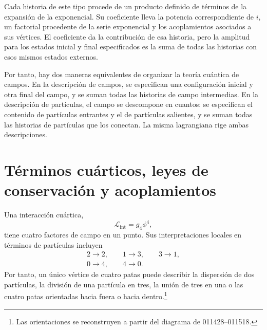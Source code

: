 Cada historia de este tipo procede de un producto definido de términos de la expansión de la exponencial. Su coeficiente lleva la potencia correspondiente de \(i\), un factorial procedente de la serie exponencial y los acoplamientos asociados a sus vértices. El coeficiente da la contribución de esa historia, pero la amplitud para los estados inicial y final especificados es la suma de todas las historias con esos mismos estados externos.

\begin{classroomqa}\end{classroomqa}

Por tanto, hay dos maneras equivalentes de organizar la teoría cuántica de campos. En la descripción de campos, se especifican una configuración inicial y otra final del campo, y se suman todas las historias de campo intermedias. En la descripción de partículas, el campo se descompone en cuantos: se especifican el contenido de partículas entrantes y el de partículas salientes, y se suman todas las historias de partículas que los conectan. La misma lagrangiana rige ambas descripciones.

\section{Términos cuárticos, leyes de conservación y acoplamientos}

Una interacción cuártica,
\begin{equation}
\mathcal{L}_{\mathrm{int}}=g_4\phi^4,
\end{equation}
tiene cuatro factores de campo en un punto. Sus interpretaciones locales en términos de partículas incluyen
\begin{equation}
\begin{gathered}
2\longrightarrow2,
\qquad
1\longrightarrow3,
\qquad
3\longrightarrow1,\\
0\longrightarrow4,
\qquad
4\longrightarrow0.
\end{gathered}
\end{equation}
Por tanto, un único vértice de cuatro patas puede describir la dispersión de dos partículas, la división de una partícula en tres, la unión de tres en una o las cuatro patas orientadas hacia fuera o hacia dentro.\footnote{Las orientaciones se reconstruyen a partir del diagrama de 011428--011518.}


